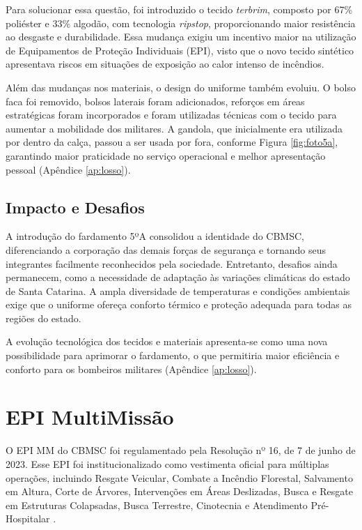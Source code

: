 Para solucionar essa questão, foi introduzido o tecido \textit{terbrim}, composto por 67\% poliéster
 e 33\% algodão, com tecnologia \textit{ripstop}, proporcionando maior resistência ao desgaste 
 e durabilidade. Essa mudança exigiu um incentivo maior na utilização de 
 Equipamentos de Proteção Individuais (\acrshort{EPI}), visto que o novo tecido sintético apresentava riscos em situações de exposição 
 ao calor intenso de incêndios.

Além das mudanças nos materiais, o design do uniforme também evoluiu. O bolso faca foi removido, 
bolsos laterais foram adicionados, reforços em áreas estratégicas foram incorporados e foram utilizadas
técnicas com o tecido para aumentar a mobilidade dos militares. A gandola, que inicialmente 
era utilizada por dentro da calça, passou a ser usada por fora, conforme Figura \ref{fig:foto5a}, garantindo maior praticidade no 
serviço operacional e melhor apresentação pessoal (Apêndice \ref{ap:losso}).


\subsection{Impacto e Desafios}

A introdução do fardamento 5ºA consolidou a identidade do \acrshort{CBMSC}, diferenciando a corporação das 
demais forças de segurança e tornando seus integrantes facilmente reconhecidos pela sociedade. 
Entretanto, desafios ainda permanecem, como a necessidade de adaptação às variações climáticas 
do estado de Santa Catarina. A ampla diversidade de temperaturas e condições ambientais exige 
que o uniforme ofereça conforto térmico e proteção adequada para todas as regiões do estado.

A evolução tecnológica dos tecidos e materiais apresenta-se como uma nova possibilidade
 para aprimorar o fardamento, o que permitiria maior eficiência e conforto para os bombeiros 
 militares (Apêndice \ref{ap:losso}). 


\section{EPI MultiMissão}

O \acrshort{EPI} \acrfull{MM} do \acrshort{CBMSC} foi regulamentado pela Resolução nº 16, de 7 de junho de 2023. Esse \acrlong{EPI} foi institucionalizado como 
vestimenta oficial para múltiplas operações, incluindo Resgate 
		Veicular, Combate a Incêndio Florestal, Salvamento em Altura, Corte de Árvores, 
		Intervenções em Áreas Deslizadas, Busca e Resgate em Estruturas Colapsadas, Busca Terrestre, Cinotecnia 
		e Atendimento Pré-Hospitalar \cite{res16}.

